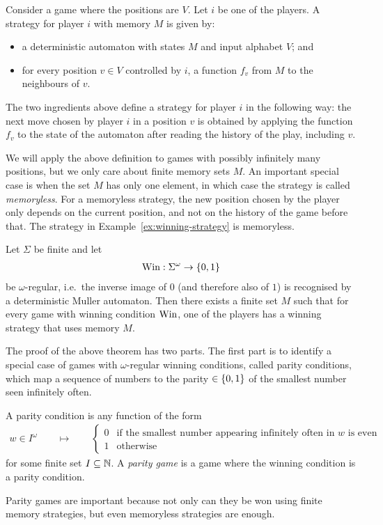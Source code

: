 \begin{definition}
	\label{def:finite-memory-strategy}
	 Consider a game where the positions are $V$. Let $i$ be one of the players. A strategy for player $i$ with memory $M$ is given by:
	 \begin{itemize}
	 	\item a deterministic automaton with states $M$ and input alphabet $V$; and
\item for every position $v \in V$ controlled by $i$, a function $f_v$ from $M$ to the neighbours of $v$.
	 \end{itemize}
The two ingredients above define a strategy for player $i$ in the following way: the next move chosen by player $i$ in a position $v$ is obtained by applying the function $f_{v}$ to the state of the automaton after reading the history of the play, including $v$. 
\end{definition}
We will apply the above definition  to games with possibly infinitely many positions, but we only care about finite memory sets $M$.
An important special case is when the set $M$ has only one element, in which case the strategy is called  \emph{memoryless}. For a memoryless strategy, the new position chosen by the player only depends on the current position, and not on the history of the game before that. The strategy in Example~\ref{ex:winning-strategy} is memoryless.

\begin{theorem} Let $\Sigma$ be finite and let 
\begin{align*}
\textup{Win} : \Sigma^\omega \to \{0,1\}	
\end{align*}
be $\omega$-regular, i.e.~the inverse image of $0$  (and therefore also  of $1$) is recognised by a deterministic  Muller automaton.  Then there exists a finite set $M$ such that for every game with winning condition $\textup{Win}$, one of the players has a winning strategy that uses memory $M$.	
\end{theorem}

The proof of the above theorem has two parts. The first part is to identify a special case of games with $\omega$-regular winning conditions, called parity conditions, which map a sequence of numbers to the parity $\in \{0,1\}$ of the smallest number seen infinitely often.

\begin{definition} A parity condition is any function of the form
\begin{align*}
w \in I^\omega \qquad \mapsto \qquad \begin{cases}
	0 & \text{if the smallest number appearing infinitely often in $w$ is even}\\
	1 & \text{otherwise}
\end{cases}	
\end{align*}
for some finite set $I \subseteq \mathbb{N}$.  A \emph{parity game} is a game where the winning condition is a parity condition.
\end{definition}
Parity games are important because not only can they be won using finite memory strategies, but even memoryless strategies are enough.

